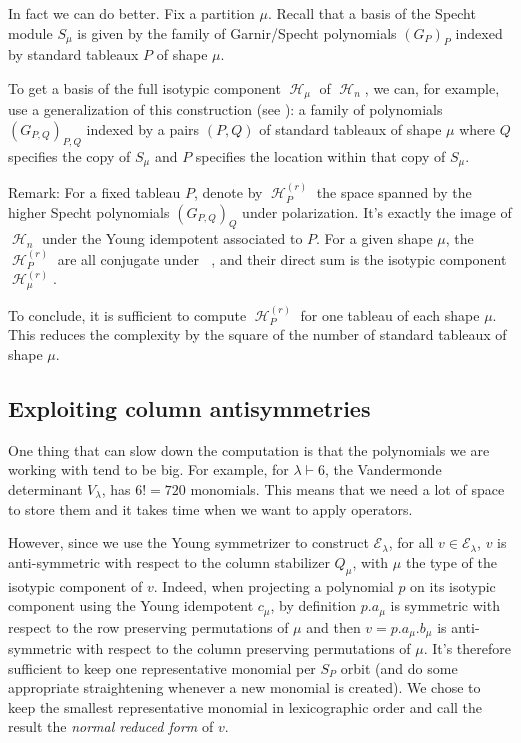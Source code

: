 \documentclass[letter,12pt]{article}
\newcommand{\pauline}[1]{\todo[linecolor=blue,backgroundcolor=cyan!25,bordercolor=blue]{#1}}
\DeclareMathOperator{\Sn}{\mathbb{S}_n}
\DeclareMathOperator{\harmonics}{\mathcal{H}}
\begin{document}
	In fact we can do better. \pauline{Does it work only for $\harmonics_n^{(r)}$ or also for $\mathcal{E}_\lambda$?}
	Fix a partition $\mu$. Recall that a basis of the Specht module $S_\mu$  is given by the family of Garnir/Specht polynomials $(G_{P})_P$ indexed by standard tableaux $P$ of shape $\mu$.
	
	To get a basis of the full isotypic component $\harmonics_{\mu}$ of $\harmonics_n$, we can, for example, use a generalization of this construction (see \cite{Ariki1997}): a family of polynomials $(G_{P,Q})_{P,Q}$ indexed by a pairs $(P,Q)$ of standard tableaux of shape $\mu$ where $Q$ specifies the copy of $S_\mu$ and $P$ specifies the location within that copy of $S_\mu$.
	
	
	Remark: For a fixed tableau $P$, denote by $\harmonics_P^{(r)}$ the space spanned by the higher Specht polynomials $(G_{P,Q})_Q$ under polarization. It's exactly the image of $\harmonics_n$ under the Young idempotent associated to $P$. For a given shape $\mu$, the $\harmonics_P^{(r)}$ are all conjugate under $\Sn$, and their direct sum is the isotypic component $\harmonics_{\mu}^{(r)}$.
	
	To conclude, it is sufficient to compute $\harmonics_P^{(r)}$ for one tableau of each shape $\mu$. This reduces the complexity by the square of the number of standard tableaux of shape $\mu$.
	
	\subsection{Exploiting column antisymmetries}
	
	One thing that can slow down the computation is that the polynomials we are working with tend to be big. For example, for $\lambda \vdash 6$, the Vandermonde determinant $V_\lambda$, has $6!=720$ monomials. This means that we need a lot of space to store them and it takes time when we want to apply operators. 
	
	However, since we use the Young symmetrizer to construct $\mathcal{E}_\lambda$, for all $v \in \mathcal{E}_\lambda$, $v$ is anti-symmetric with respect to the column stabilizer $Q_\mu$, with $\mu$ the type of the isotypic component of $v$. Indeed, when projecting a polynomial $p$ on its isotypic component using the Young idempotent $c_\mu$, by definition $p.a_\mu$ is symmetric with respect to the row preserving permutations of $\mu$ and then $v = p.a_\mu.b_\mu$ is anti-symmetric with respect to the column preserving permutations of $\mu$. 
	It's therefore sufficient to keep one representative monomial per $S_P$ orbit \pauline{$S_P$ orbit?} (and do some appropriate straightening whenever a new monomial is created). We chose to keep the smallest representative monomial in lexicographic order and call the result the \emph{normal reduced form} of $v$. \\
	
\end{document}
